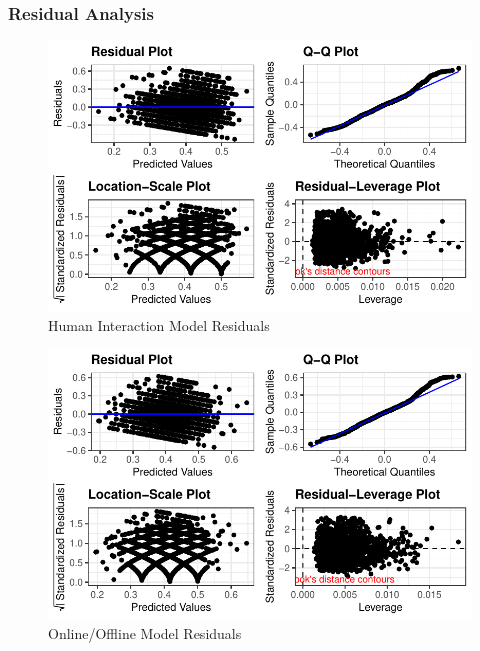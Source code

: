 \documentclass[
  letterpaper,
  DIV=11,
  numbers=noendperiod]{scrartcl}
\begin{document}
\newpage{}

\hypertarget{residual-analysis}{%
\subsubsection{Residual Analysis}\label{residual-analysis}}

\begin{figure}

{\centering \includegraphics{Social-Isolation-in-China_files/figure-pdf/fig-resids-human-1.pdf}

}

\caption{\label{fig-resids-human}Human Interaction Model Residuals}

\end{figure}

\begin{figure}

{\centering \includegraphics{Social-Isolation-in-China_files/figure-pdf/fig-resids-online-offline-1.pdf}

}

\caption{\label{fig-resids-online-offline}Online/Offline Model
Residuals}

\end{figure}
\end{document}
